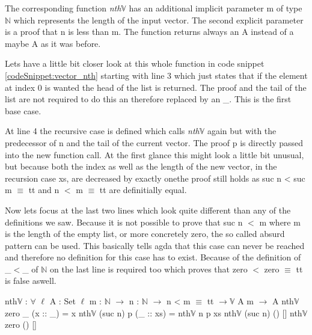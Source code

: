 The corresponding function \emph{nth$\mathbb{V}$} has an additional implicit parameter m of type $\mathbb{N}$ which represents the length of the input vector. 
The second explicit parameter is a proof that n is less than m. 
The function returns always an A instead of a maybe A as it was before.

Lets have a little bit closer look at this whole function in code snippet \ref{codeSnippet:vector_nth} starting with line 3 which just states that if the element at index 0 is wanted the head of the list is returned. 
The proof and the tail of the list are not required to do this an therefore replaced by an \_. This is the first base case.

At line 4 the recursive case is defined which calls \emph{nth$\mathbb{V}$} again but with the predecessor of n and the tail of the current vector.
The proof p is directly passed into the new function call. At the first glance this might look a little bit unusual, but because both the index as well as the length of the new vector, in the recursion case xs, 
are decreased by exactly onethe proof still holds as suc n < suc m $\equiv$ tt and n $<$ m $\equiv$ tt are definitially equal.

Now lets focus at the last two lines which look quite different than any of the definitions we saw.
Because it is not possible to prove that suc n $<$ m where m is the length of the empty list, or more concretely zero, the so called absurd pattern can be used. This basically tells agda that this case can never be reached and therefore no definition for this case has to exist.
Because of the definition of \_$<$\_ of $\mathbb{N}$ on the last line is required too which proves that zero $<$ zero $\equiv$ tt is false aswell.  

\begin{codesnippet}[mathescape=true, caption={Definition of \emph{nth} function in Agda}, label={codeSnippet:vector_nth}]
nth$\mathbb{V}$ : $\forall$ {$\ell$} {A : Set $\ell$} {m : $\mathbb{N}$} $\rightarrow$
       n : $\mathbb{N}$ $\rightarrow$ n < m $\equiv$ tt $\rightarrow \mathbb{V}$ A m $\rightarrow$ A
nth$\mathbb{V}$ zero _ (x :: _) = x
nth$\mathbb{V}$ (suc n) p (_ :: xs) = nth$\mathbb{V}$ n p xs
nth$\mathbb{V}$ (suc n) () []
nth$\mathbb{V}$ zero () []
\end{codesnippet}

